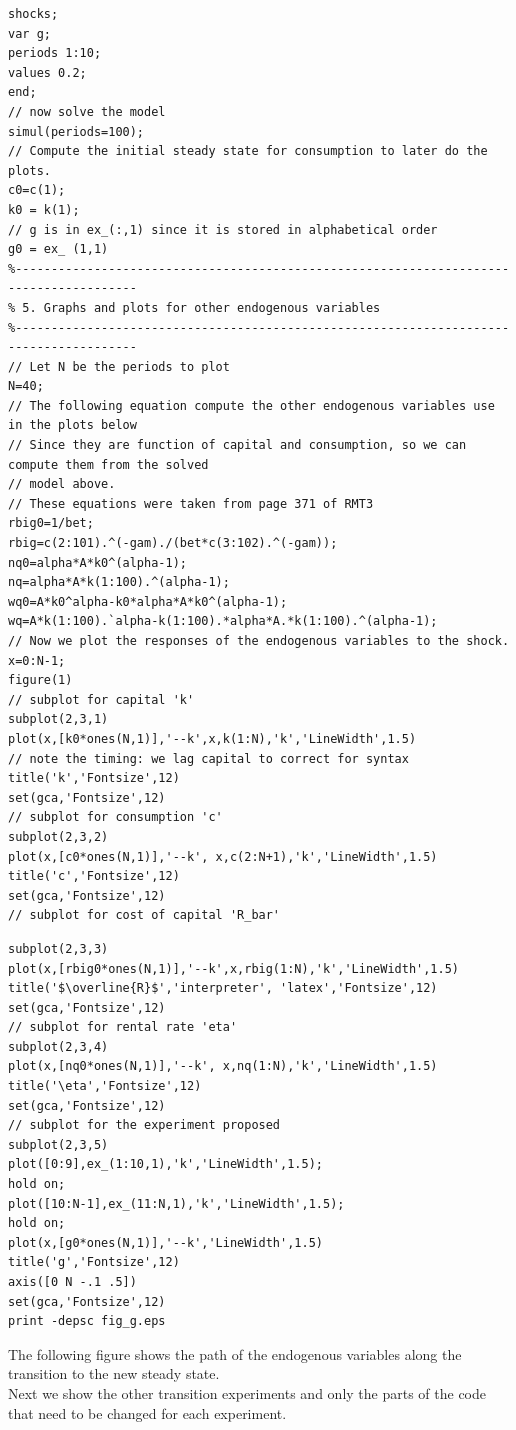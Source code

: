 \documentclass[10pt]{article}
\begin{document}
\begin{verbatim}
shocks;
var g;
periods 1:10;
values 0.2;
end;
// now solve the model
simul(periods=100);
// Compute the initial steady state for consumption to later do the plots.
c0=c(1);
k0 = k(1);
// g is in ex_(:,1) since it is stored in alphabetical order
g0 = ex_ (1,1)
%---------------------------------------------------------------------------------------
% 5. Graphs and plots for other endogenous variables
%---------------------------------------------------------------------------------------
// Let N be the periods to plot
N=40;
// The following equation compute the other endogenous variables use in the plots below
// Since they are function of capital and consumption, so we can compute them from the solved
// model above.
// These equations were taken from page 371 of RMT3
rbig0=1/bet;
rbig=c(2:101).^(-gam)./(bet*c(3:102).^(-gam));
nq0=alpha*A*k0^(alpha-1);
nq=alpha*A*k(1:100).^(alpha-1);
wq0=A*k0^alpha-k0*alpha*A*k0^(alpha-1);
wq=A*k(1:100).`alpha-k(1:100).*alpha*A.*k(1:100).^(alpha-1);
// Now we plot the responses of the endogenous variables to the shock.
x=0:N-1;
figure(1)
// subplot for capital 'k'
subplot(2,3,1)
plot(x,[k0*ones(N,1)],'--k',x,k(1:N),'k','LineWidth',1.5)
// note the timing: we lag capital to correct for syntax
title('k','Fontsize',12)
set(gca,'Fontsize',12)
// subplot for consumption 'c'
subplot(2,3,2)
plot(x,[c0*ones(N,1)],'--k', x,c(2:N+1),'k','LineWidth',1.5)
title('c','Fontsize',12)
set(gca,'Fontsize',12)
// subplot for cost of capital 'R_bar'
\end{verbatim}

\begin{verbatim}
subplot(2,3,3)
plot(x,[rbig0*ones(N,1)],'--k',x,rbig(1:N),'k','LineWidth',1.5)
title('$\overline{R}$','interpreter', 'latex','Fontsize',12)
set(gca,'Fontsize',12)
// subplot for rental rate 'eta'
subplot(2,3,4)
plot(x,[nq0*ones(N,1)],'--k', x,nq(1:N),'k','LineWidth',1.5)
title('\eta','Fontsize',12)
set(gca,'Fontsize',12)
// subplot for the experiment proposed
subplot(2,3,5)
plot([0:9],ex_(1:10,1),'k','LineWidth',1.5);
hold on;
plot([10:N-1],ex_(11:N,1),'k','LineWidth',1.5);
hold on;
plot(x,[g0*ones(N,1)],'--k','LineWidth',1.5)
title('g','Fontsize',12)
axis([0 N -.1 .5])
set(gca,'Fontsize',12)
print -depsc fig_g.eps
\end{verbatim}

The following figure shows the path of the endogenous variables along the transition to the new steady state.\\
Next we show the other transition experiments and only the parts of the code that need to be changed for each experiment.
\end{document}
